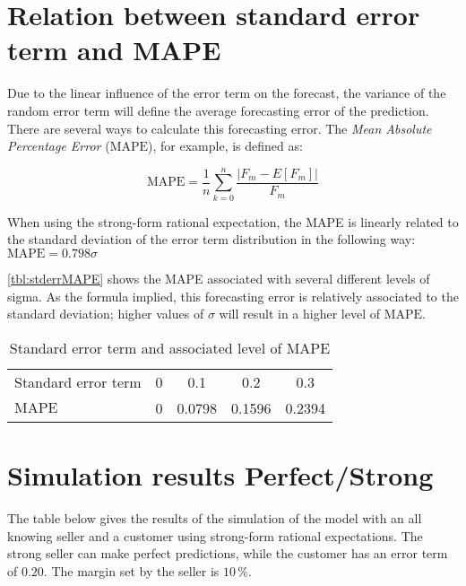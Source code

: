 \chapter{Relation between standard error term and MAPE}
\label{app:errorMAPE}
Due to the linear influence of the error term on the forecast, the variance of the random error term will define the average forecasting error of the prediction. There are several ways to calculate this forecasting error. The \emph{Mean Absolute Percentage Error} ($\mbox{MAPE}$), for example, is defined as:

$$ \mbox{MAPE} = \frac{1}{n} \sum\limits_{k=0}^n \frac{|F_m - E[F_m]|}{F_m} $$

When using the strong-form rational expectation, the MAPE is linearly related to the standard deviation of the error term distribution in the following way: $ \mbox{MAPE} = 0.798 \sigma $

\autoref{tbl:stderrMAPE} shows the MAPE associated with several different levels of sigma. As the formula implied, this forecasting error is relatively associated to the standard deviation; higher values of $\sigma$ will result in a higher level of $\mbox{MAPE}$.


\begin{table}
\centering
\begin{tabular}{l c c c c}
\toprule

Standard error term  &  0  &  0.1  &  0.2  &  0.3  \\
$\mbox{MAPE}$        &  0  &  0.0798  &  0.1596  &  0.2394  \\
\bottomrule
\end{tabular}
\caption{Standard error term and associated level of MAPE}
\label{tbl:stderrMAPE}
\end{table}



\chapter{Simulation results Perfect/Strong}
\label{app:SimulationResultsPerfectStrong}
The table below gives the results of the simulation of the model with an all knowing seller and a customer using strong-form rational expectations. The strong seller can make perfect predictions, while the customer has an error term of $0.20$. The margin set by the seller is $10\,\%$.

